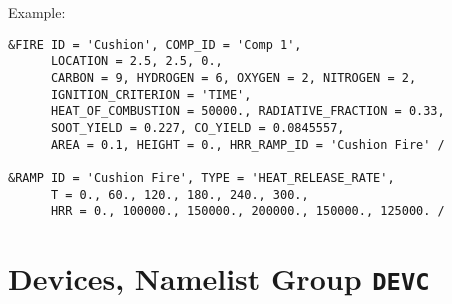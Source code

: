 \vspace{\baselineskip}
\noindent Example:
\begin{lstlisting}
&FIRE ID = 'Cushion', COMP_ID = 'Comp 1',
      LOCATION = 2.5, 2.5, 0.,
      CARBON = 9, HYDROGEN = 6, OXYGEN = 2, NITROGEN = 2,
      IGNITION_CRITERION = 'TIME',
      HEAT_OF_COMBUSTION = 50000., RADIATIVE_FRACTION = 0.33,
      SOOT_YIELD = 0.227, CO_YIELD = 0.0845557,
      AREA = 0.1, HEIGHT = 0., HRR_RAMP_ID = 'Cushion Fire' /

&RAMP ID = 'Cushion Fire', TYPE = 'HEAT_RELEASE_RATE',
      T = 0., 60., 120., 180., 240., 300.,
      HRR = 0., 100000., 150000., 200000., 150000., 125000. /
\end{lstlisting}




\clearpage
\section{Devices, Namelist Group \texorpdfstring{{\tt DEVC}}{DEVC}}

\label{info:DEVC3}

